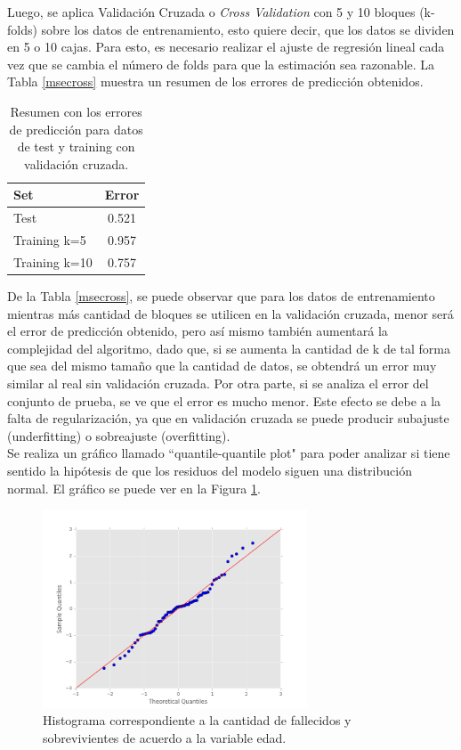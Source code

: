 \documentclass[letter, 10pt]{article}
\begin{document}
Luego, se aplica Validación Cruzada o \textit{Cross Validation} con 5 y 10 bloques (k-folds) sobre los datos de entrenamiento, esto quiere decir, que los datos se dividen en 5 o 10 cajas. Para esto, es necesario realizar el ajuste de regresión lineal cada vez que se cambia el número de folds para que la estimación sea razonable. La Tabla \ref{msecross} muestra un resumen de los errores de predicción obtenidos.

\begin{table}[!hbt] 
\begin{center}
\begin{tabular}{| l | c |} 
\hline
\textbf{Set} & \textbf{Error}\\ 
\hline 
Test & 0.521\\ 
Training k=5 &0.957\\
Training k=10 &0.757\\
\hline 
\end{tabular}
\caption{Resumen con los errores de predicción para datos de test y training con validación cruzada.} 
\label{table:msecross}
\end{center} 
\end{table}

De la Tabla \ref{msecross}, se puede observar que para los datos de entrenamiento mientras más cantidad de bloques se utilicen en la validación cruzada, menor será el error de predicción obtenido, pero así mismo también aumentará la complejidad del algoritmo, dado que, si se aumenta la cantidad de k de tal forma que sea del mismo tamaño que la cantidad de datos, se obtendrá un error muy similar al real sin validación cruzada. Por otra parte, si se analiza el error del conjunto de prueba, se ve que el error es mucho menor. Este efecto se debe a la falta de regularización, ya que en validación cruzada se puede producir subajuste (underfitting) o sobreajuste (overfitting).\\

Se realiza un gráfico llamado ``quantile-quantile plot" para poder analizar si tiene sentido la hipótesis de que los residuos del modelo siguen una distribución normal. El gráfico se puede ver en la Figura \ref{qqplot}.

\begin{figure}[h]
\begin{center}
\includegraphics[width=0.7\textwidth]{Images/grafico1-j.png}
\caption{Histograma correspondiente a la cantidad de fallecidos y sobrevivientes de acuerdo a la variable edad.}
\label{qqplot}
\end{center}
\end{figure}
\end{document}
